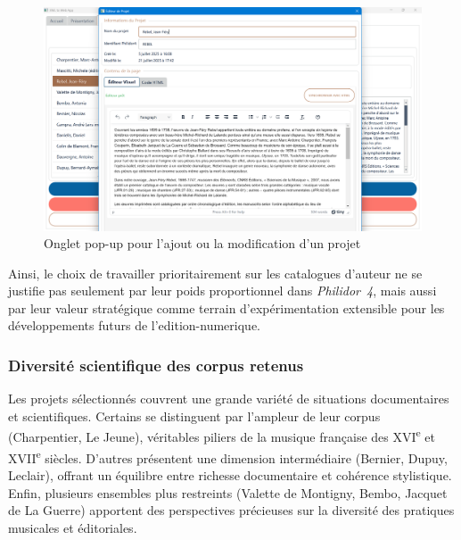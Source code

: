 \begin{figure}[h]
	\caption{Onglet pop-up pour l'ajout ou la modification d'un projet} \label{appli-popup-projet}
	\centering
	\includegraphics[width=\textwidth]{images/appli-popup-modif-projet.png}
\end{figure}

Ainsi, le choix de travailler prioritairement sur les catalogues d’auteur ne se justifie pas seulement par leur poids proportionnel dans \textit{Philidor~4}, mais aussi par leur valeur stratégique comme terrain d’expérimentation extensible pour les développements futurs de l’\gls{edition-numerique}.

\subsubsection{Diversité scientifique des corpus retenus}

Les projets sélectionnés couvrent une grande variété de situations documentaires et scientifiques. 
Certains se distinguent par l’ampleur de leur corpus (Charpentier, Le Jeune), véritables piliers de la musique française des XVI\textsuperscript{e} et XVII\textsuperscript{e} siècles. 
D’autres présentent une dimension intermédiaire (Bernier, Dupuy, Leclair), offrant un équilibre entre richesse documentaire et cohérence stylistique. 
Enfin, plusieurs ensembles plus restreints (Valette de Montigny, Bembo, Jacquet de La Guerre) apportent des perspectives précieuses sur la diversité des pratiques musicales et éditoriales.

